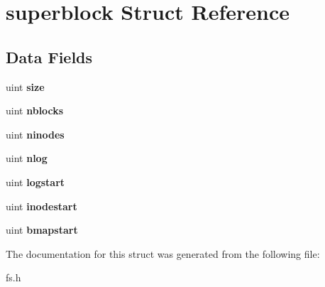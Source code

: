 \hypertarget{structsuperblock}{}\section{superblock Struct Reference}
\label{structsuperblock}
\subsection*{Data Fields}
\begin{DoxyCompactItemize}
\item 
uint {\bfseries size}\hypertarget{structsuperblock_a7c6e4d6da139ecee74eb7816d5d44fa6}{}\label{structsuperblock_a7c6e4d6da139ecee74eb7816d5d44fa6}

\item 
uint {\bfseries nblocks}\hypertarget{structsuperblock_a2a27a7cfb54689f0e1dcd1788d049218}{}\label{structsuperblock_a2a27a7cfb54689f0e1dcd1788d049218}

\item 
uint {\bfseries ninodes}\hypertarget{structsuperblock_a355d2a1ebdc51f80820c23e69363cf42}{}\label{structsuperblock_a355d2a1ebdc51f80820c23e69363cf42}

\item 
uint {\bfseries nlog}\hypertarget{structsuperblock_aea92ae872785fd4fb39b903d9157aac5}{}\label{structsuperblock_aea92ae872785fd4fb39b903d9157aac5}

\item 
uint {\bfseries logstart}\hypertarget{structsuperblock_a460268b28aced19797e8d7b84aa60ebf}{}\label{structsuperblock_a460268b28aced19797e8d7b84aa60ebf}

\item 
uint {\bfseries inodestart}\hypertarget{structsuperblock_adde361528f3905445974301b424611c1}{}\label{structsuperblock_adde361528f3905445974301b424611c1}

\item 
uint {\bfseries bmapstart}\hypertarget{structsuperblock_a3c815dda5be6bda609389e76434171cc}{}\label{structsuperblock_a3c815dda5be6bda609389e76434171cc}

\end{DoxyCompactItemize}


The documentation for this struct was generated from the following file\+:\begin{DoxyCompactItemize}
\item 
fs.\+h\end{DoxyCompactItemize}
